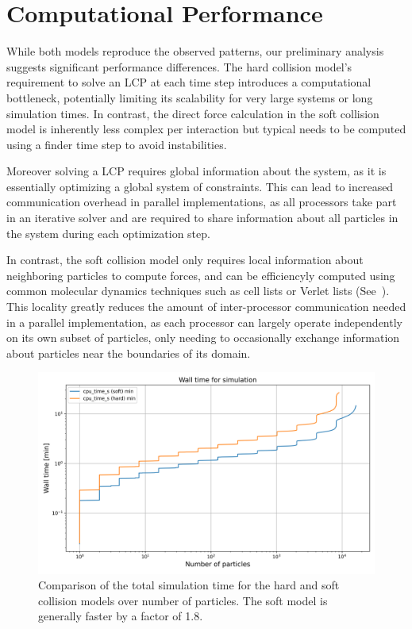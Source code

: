 \documentclass[conference]{IEEEtran}
\begin{document}
\section{Computational Performance}

While both models reproduce the observed patterns, our preliminary analysis suggests significant performance differences. The hard collision model's requirement to solve an LCP at each time step introduces a computational bottleneck, potentially limiting its scalability for very large systems or long simulation times. In contrast, the direct force calculation in the soft collision model is inherently less complex per interaction but typical needs to be computed using a finder time step to avoid instabilities.


Moreover solving a LCP requires global information about the system, as it is essentially optimizing a global system of constraints. This can lead to increased communication overhead in parallel implementations, as all processors take part in an iterative solver and are required to share information about all particles in the system during each optimization step.


In contrast, the soft collision model only requires local information about neighboring particles to compute forces, and can be efficiencyly computed using common molecular dynamics techniques such as cell lists or Verlet lists (See~\cite{Gratl2019}). This locality greatly reduces the amount of inter-processor communication needed in a parallel implementation, as each processor can largely operate independently on its own subset of particles, only needing to occasionally exchange information about particles near the boundaries of its domain.


\begin{figure}
    \centering
    \includegraphics[width=\linewidth]{figures/comparisons/wall_time_simulation.png}
    \caption{Comparison of the total simulation time for the hard and soft collision models over number of particles. The soft model is generally faster by a factor of 1.8.}
    \label{figure:wall_time_simulation}
\end{figure}
\end{document}
